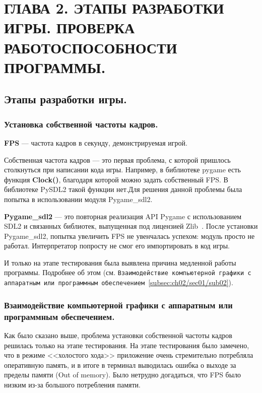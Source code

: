 \chapter{\label{ch:ch02}ГЛАВА 2. ЭТАПЫ РАЗРАБОТКИ ИГРЫ. ПРОВЕРКА РАБОТОСПОСОБНОСТИ ПРОГРАММЫ.}

\section{\label{sec:ch02/sec01}Этапы разработки игры.}

\subsection{\label{subsec:ch02/sec01/sub01}Установка собственной частоты кадров.}
\textbf{FPS} --- частота кадров в секунду, демонстрируемая игрой.

Собственная частота кадров --- это первая проблема, с которой пришлось столкнуться при написании кода игры. Например, в библиотеке pygame есть функция \textbf{Clock()},
благодаря которой можно задать собственный FPS. В библиотеке PySDL2 такой функции нет.Для решения данной проблемы была попытка в использовании модуля Pygame\_sdl2.

\textbf{Pygame\_sdl2} --- это повторная реализация API Pygame с использованием SDL2 и связанных библиотек, выпущенная под лицензией Zlib~\cite{pgsdl2EN}.
После установки Pygame\_sdl2, попытка увеличить FPS не увенчалась успехом: модуль просто не работал. Интерпретатор попросту не смог его импортировать в код игры.

И только на этапе тестирования была выявлена причина медленной работы программы. 
Подробнее об этом (см. \texttt{Взаимодействие компьютерной графики с аппаратным или программным обеспечением}~\ref{subsec:ch02/sec01/sub02}).

\subsection{\label{subsec:ch02/sec01/sub02}Взаимодействие компьютерной графики с аппаратным или программным обеспечением.}
Как было сказано выше, проблема установки собственной частоты кадров решилась только на этапе тестирования. На этапе тестирования было замечено, что в режиме <<холостого хода>>
приложение очень стремительно потребляла оперативную память, и в итоге в терминал выводилась ошибка о выходе за пределы памяти (Out of memory). Было нетрудно догадаться,
что FPS было низким из-за большого потребления памяти.

